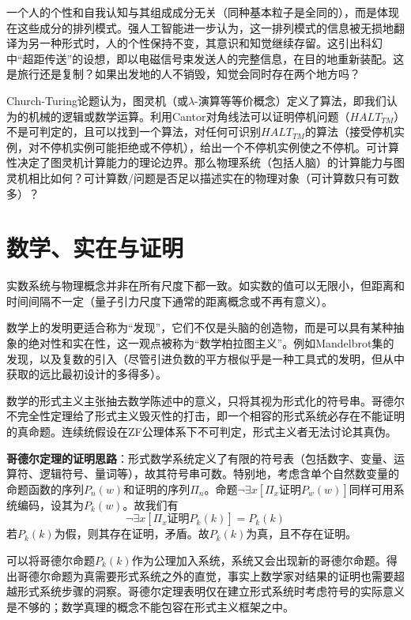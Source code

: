 \par 一个人的个性和自我认知与其组成成分无关（同种基本粒子是全同的），而是体现在这些成分的排列模式。强人工智能进一步认为，这一排列模式的信息被无损地翻译为另一种形式时，人的个性保持不变，其意识和知觉继续存留。这引出科幻中“超距传送”的设想，即以电磁信号束发送人的完整信息，在目的地重新装配。这是旅行还是复制？如果出发地的人不销毁，知觉会同时存在两个地方吗？

\par Church-Turing论题认为，图灵机（或$\lambda$-演算等等价概念）定义了算法，即我们认为的机械的逻辑或数学运算。利用Cantor对角线法可以证明停机问题（$HALT_{TM}$）不是可判定的，且可以找到一个算法，对任何可识别$HALT_{TM}$的算法（接受停机实例，对不停机实例可能拒绝或不停机），给出一个不停机实例使之不停机。可计算性决定了图灵机计算能力的理论边界。那么物理系统（包括人脑）的计算能力与图灵机相比如何？可计算数/问题是否足以描述实在的物理对象（可计算数只有可数多）？

\section{数学、实在与证明}
\par 实数系统与物理概念并非在所有尺度下都一致。如实数的值可以无限小，但距离和时间间隔不一定（量子引力尺度下通常的距离概念或不再有意义）。

\par 数学上的发明更适合称为``发现''，它们不仅是头脑的创造物，而是可以具有某种抽象的绝对性和实在性，这一观点被称为``数学柏拉图主义''。例如Mandelbrot集的发现，以及复数的引入（尽管引进负数的平方根似乎是一种工具式的发明，但从中获取的远比最初设计的多得多）。

\par 数学的形式主义主张抽去数学陈述中的意义，只将其视为形式化的符号串。哥德尔不完全性定理给了形式主义毁灭性的打击，即一个相容的形式系统必存在不能证明的真命题。连续统假设在ZF公理体系下不可判定，形式主义者无法讨论其真伪。

\par \textbf{哥德尔定理的证明思路}：形式数学系统定义了有限的符号表（包括数字、变量、运算符、逻辑符号、量词等），故其符号串可数。特别地，考虑含单个自然数变量的命题函数的序列$P_n(w)$和证明的序列$\Pi_n$。命题$\lnot \exists x [\Pi_x \text{证明} P_w(w)]$同样可用系统编码，设其为$P_k(w)$。故我们有
\begin{displaymath}
\lnot \exists x [\Pi_x \text{证明} P_k(k)]=P_k(k)
\end{displaymath}
若$P_k(k)$为假，则其存在证明，矛盾。故$P_k(k)$为真，且不存在证明。

\par 可以将哥德尔命题$P_k(k)$作为公理加入系统，系统又会出现新的哥德尔命题。得出哥德尔命题为真需要形式系统之外的直觉，事实上数学家对结果的证明也需要超越形式系统步骤的洞察。哥德尔定理表明仅在建立形式系统时考虑符号的实际意义是不够的；数学真理的概念不能包容在形式主义框架之中。